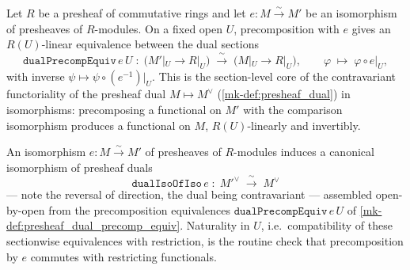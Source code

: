 \begin{definition}\label{mk-def:presheaf_dual_precomp_equiv}
  \leanok

  Let \(R\) be a presheaf of commutative rings and let \(e : M \xrightarrow{\sim} M'\)
  be an isomorphism of presheaves of \(R\)-modules. On a fixed open \(U\), precomposition
  with \(e\) gives an \(R(U)\)-linear equivalence between the dual sections
  \[
    \mathtt{dualPrecompEquiv}\,e\,U \;\colon\;
      \bigl(M'|_U \to R|_U\bigr) \;\xrightarrow{\ \sim\ }\; \bigl(M|_U \to R|_U\bigr),
      \qquad \varphi \;\longmapsto\; \varphi \circ e|_U,
  \]
  with inverse \(\psi \mapsto \psi \circ (e^{-1})|_U\). This is the section-level core of
  the contravariant functoriality of the presheaf dual \(M \mapsto M^\vee\)
  (\ref{mk-def:presheaf_dual}) in isomorphisms: precomposing a functional on \(M'\) with
  the comparison isomorphism produces a functional on \(M\), \(R(U)\)-linearly and
  invertibly.
\end{definition}

\begin{definition}\label{mk-def:presheaf_dual_iso_of_iso}
  \leanok

  An isomorphism \(e : M \xrightarrow{\sim} M'\) of presheaves of \(R\)-modules induces a
  canonical isomorphism of presheaf duals
  \[
    \mathtt{dualIsoOfIso}\,e \;\colon\; M'^\vee \;\xrightarrow{\ \sim\ }\; M^\vee
  \]
  --- note the reversal of direction, the dual being contravariant --- assembled
  open-by-open from the precomposition equivalences
  \(\mathtt{dualPrecompEquiv}\,e\,U\) of \ref{mk-def:presheaf_dual_precomp_equiv}.
  Naturality in \(U\), i.e.\ compatibility of these sectionwise equivalences with
  restriction, is the routine check that precomposition by \(e\) commutes with
  restricting functionals.
\end{definition}

